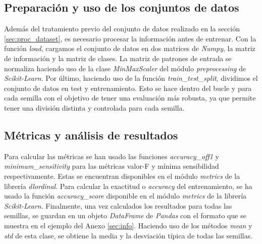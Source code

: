 \subsection{Preparación y uso de los conjuntos de datos}
\label{subsec:datos_experimentales}

Además del tratamiento previo del conjunto de datos realizado en la sección \ref{sec:proc_dataset}, es necesario procesar la información antes de entrenar. Con la función \textit{load}, cargamos el conjunto de datos en dos matrices de \textit{Numpy}, la matriz de información y la matriz de clases. La matriz de patrones de entrada se normaliza haciendo uso de la clase \textit{MinMaxScaler} del módulo \textit{preprocessing} de \textit{Scikit-Learn}. Por último, haciendo uso de la función \textit{train\_test\_split}, dividimos el conjunto de datos en test y entrenamiento. Esto se hace dentro del bucle y para cada semilla con el objetivo de tener una evaluación más robusta, ya que permite tener una división distinta y controlada para cada semilla.

\subsection{Métricas y análisis de resultados}
\label{subsec:metricas_pruebas}

Para calcular las métricas se han usado las funciones \textit{accuracy\_off1} y \textit{minimum\_sensitivity} para las métricas valor-F y mínima sensibilidad respectivamente. Estas se encuentran disponibles en el módulo \textit{metrics} de la librería \textit{dlordinal}. Para calcular la exactitud o \textit{accuracy} del entrenamiento, se ha usado la función \textit{accuracy\_score} disponible en el módulo \textit{metrics} de la librería \textit{Scikit-Learn}. Finalmente, una vez calculados los resultados para todas las semillas, se guardan en un objeto \textit{DataFrame} de \textit{Pandas} con el formato que se muestra en el ejemplo del Anexo \ref{sec:info}. Haciendo uso de los métodos \textit{mean} y \textit{std} de esta clase, se obtiene la media y la desviación típica de todas las semillas.
